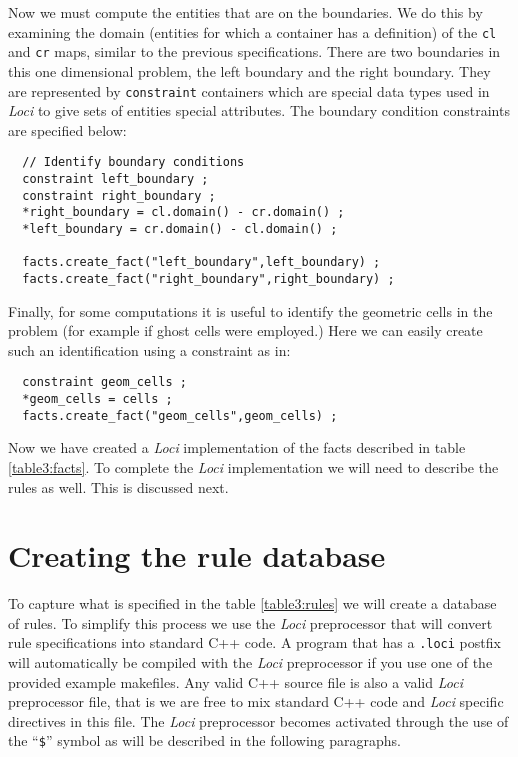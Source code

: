 \documentclass[10pt,epsf]{book}
\begin{document}
Now we must compute the entities that are on the boundaries.  We do
this by examining the domain (entities for which a container has a
definition) of the {\tt cl} and {\tt cr} maps, similar to the previous
specifications.  There are two boundaries in this one dimensional
problem, the left boundary and the right boundary.  They are
represented by {\tt constraint} containers which are special data
types used in {\it Loci} to give sets of entities special attributes.  The
boundary condition constraints are specified below:
\begin{verbatim}
  // Identify boundary conditions
  constraint left_boundary ;
  constraint right_boundary ;
  *right_boundary = cl.domain() - cr.domain() ;
  *left_boundary = cr.domain() - cl.domain() ;

  facts.create_fact("left_boundary",left_boundary) ;
  facts.create_fact("right_boundary",right_boundary) ;
\end{verbatim}
Finally, for some computations it is useful to identify the geometric
cells in the problem (for example if ghost cells were employed.)  Here
we can easily create such an identification using a constraint as in:
\begin{verbatim}
  constraint geom_cells ;
  *geom_cells = cells ;
  facts.create_fact("geom_cells",geom_cells) ;
\end{verbatim}

Now we have created a {\it Loci} implementation of the facts described in
table \ref{table3:facts}.  To complete the {\it Loci} implementation we will
need to describe the rules as well.  This is discussed next.

\section{Creating the rule database}

To capture what is specified in the table \ref{table3:rules} we will
create a database of rules.  To simplify this process we use the {\it Loci}
preprocessor that will convert rule specifications into standard C++
code.  A program that has a {\tt .loci} postfix will automatically be
compiled with the {\it Loci} preprocessor if you use one of the provided
example makefiles.  Any valid C++ source file is also a valid {\it Loci}
preprocessor file, that is we are free to mix standard C++ code and
{\it Loci} specific directives in this file.  The {\it Loci} preprocessor becomes
activated through the use of the ``{\tt \$}'' symbol as will be
described in the following paragraphs.
\end{document}
